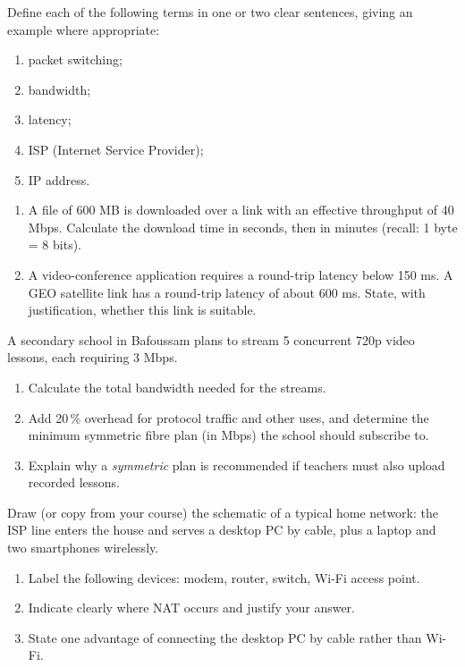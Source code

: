 \documentclass[11pt]{article}
\newcounter{popsec}
\newcounter{popsub}
\newcommand{\courssub}[1]{%
  \stepcounter{popsub}%
  \par\vspace{9pt}\noindent{\popxbold\fontsize{11.5}{13}\selectfont\color{popink}{\color{poporange}\thepopsec.\thepopsub}\hspace{6pt}#1}\par\nopagebreak\vspace{4pt}
}
\begin{document}
\begin{exercice}[Definitions]
Define each of the following terms in one or two clear sentences, giving an example where appropriate:
\begin{enumerate}
\item packet switching;
\item bandwidth;
\item latency;
\item ISP (Internet Service Provider);
\item IP address.
\end{enumerate}
\end{exercice}

\begin{exercice}
\begin{enumerate}
\item A file of 600 MB is downloaded over a link with an effective throughput of 40 Mbps. Calculate the download time in seconds, then in minutes (recall: 1 byte = 8 bits).
\item A video-conference application requires a round-trip latency below 150 ms. A GEO satellite link has a round-trip latency of about 600 ms. State, with justification, whether this link is suitable.
\end{enumerate}
\end{exercice}

\courssub{I practise}

\begin{exercice}
A secondary school in Bafoussam plans to stream 5 concurrent 720p video lessons, each requiring 3 Mbps.
\begin{enumerate}
\item Calculate the total bandwidth needed for the streams.
\item Add 20\,\% overhead for protocol traffic and other uses, and determine the minimum symmetric fibre plan (in Mbps) the school should subscribe to.
\item Explain why a \emph{symmetric} plan is recommended if teachers must also upload recorded lessons.
\end{enumerate}
\end{exercice}

\begin{exercice}
Draw (or copy from your course) the schematic of a typical home network: the ISP line enters the house and serves a desktop PC by cable, plus a laptop and two smartphones wirelessly.
\begin{enumerate}
\item Label the following devices: modem, router, switch, Wi-Fi access point.
\item Indicate clearly where NAT occurs and justify your answer.
\item State one advantage of connecting the desktop PC by cable rather than Wi-Fi.
\end{enumerate}
\end{exercice}
\end{document}
